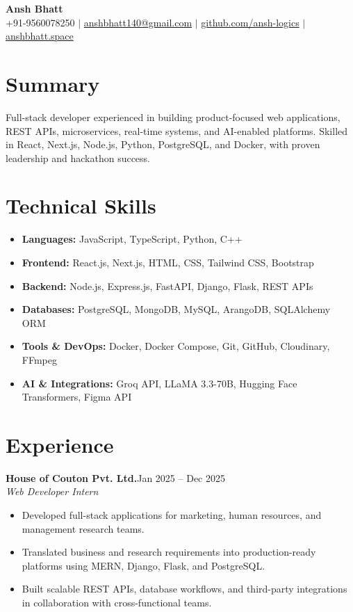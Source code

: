 \documentclass[11pt,a4paper]{article}
\begin{document}
\begin{center}
  {\LARGE\textbf{Ansh Bhatt}}\\[4pt]
  \small
  +91-9560078250
  \quad $|$ \quad
  \href{mailto:anshbhatt140@gmail.com}{anshbhatt140@gmail.com}
  \quad $|$ \quad
  \href{https://github.com/ansh-logics}{github.com/ansh-logics}
  \quad $|$ \quad
  \href{https://anshbhatt.space}{anshbhatt.space}
\end{center}

\section*{Summary}
Full-stack developer experienced in building product-focused web applications, REST APIs, microservices, real-time systems, and AI-enabled platforms. Skilled in React, Next.js, Node.js, Python, PostgreSQL, and Docker, with proven leadership and hackathon success.

\section*{Technical Skills}
\begin{itemize}
  \item \textbf{Languages:} JavaScript, TypeScript, Python, C++
  \item \textbf{Frontend:} React.js, Next.js, HTML, CSS, Tailwind CSS, Bootstrap
  \item \textbf{Backend:} Node.js, Express.js, FastAPI, Django, Flask, REST APIs
  \item \textbf{Databases:} PostgreSQL, MongoDB, MySQL, ArangoDB, SQLAlchemy ORM
  \item \textbf{Tools \& DevOps:} Docker, Docker Compose, Git, GitHub, Cloudinary, FFmpeg
  \item \textbf{AI \& Integrations:} Groq API, LLaMA 3.3-70B, Hugging Face Transformers, Figma API
\end{itemize}

\section*{Experience}

\textbf{House of Couton Pvt. Ltd.}\hfill Jan 2025 -- Dec 2025\\
\textit{Web Developer Intern}
\begin{itemize}
  \item Developed full-stack applications for marketing, human resources, and management research teams.
  \item Translated business and research requirements into production-ready platforms using MERN, Django, Flask, and PostgreSQL.
  \item Built scalable REST APIs, database workflows, and third-party integrations in collaboration with cross-functional teams.
\end{itemize}
\end{document}
